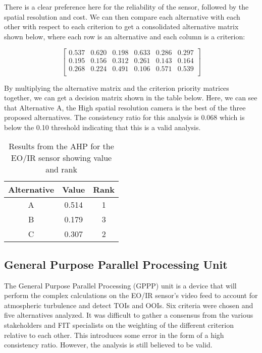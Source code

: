 \begin{fullwidth}
        There is a clear preference here for the reliability of the sensor, followed by the spatial resolution and cost. We can then compare each alternative with each other with respect to each criterion to get a consolidated alternative matrix shown below, where each row is an alternative and each column is a criterion:

        \[ 
        \left[ {\begin{array}{cccccc}
        0.537 & 0.620 & 0.198 & 0.633 & 0.286 & 0.297 \\
        0.195 & 0.156 & 0.312 & 0.261 & 0.143 & 0.164 \\
        0.268 & 0.224 & 0.491 & 0.106 & 0.571 & 0.539 \\
        \end{array} } \right]
        \]

        By multiplying the alternative matrix and the criterion priority matrices together, we can get a decision matrix shown in the table below. Here, we can see that Alternative A, the High spatial resolution camera is the best of the three proposed alternatives. The consistency ratio for this analysis is 0.068 which is below the 0.10 threshold indicating that this is a valid analysis.

        \begin{table}[]
            \centering
            \begin{tabular}{|c|c|c|}
                \hline
                \textbf{Alternative} & \textbf{Value} & \textbf{Rank} \\
                \hline
                A & 0.514 & 1 \\ \hline
                B & 0.179 & 3 \\ \hline
                C & 0.307 & 2 \\ \hline
            \end{tabular}
            \caption{Results from the AHP for the EO/IR sensor showing value and rank}
            \label{tab:eoir_ahp_results}
        \end{table}

    \subsection{General Purpose Parallel Processing Unit}
        The General Purpose Parallel Processing (GPPP) unit is a device that will perform the complex calculations on the EO/IR sensor's video feed to account for atmospheric turbulence and detect TOIs and OOIs. Six criteria were chosen and five alternatives analyzed. It was difficult to gather a consensus from the various stakeholders and FIT specialists on the weighting of the different criterion relative to each other. This introduces some error in the form of a high consistency ratio. However, the analysis is still believed to be valid.
    

\end{fullwidth}
